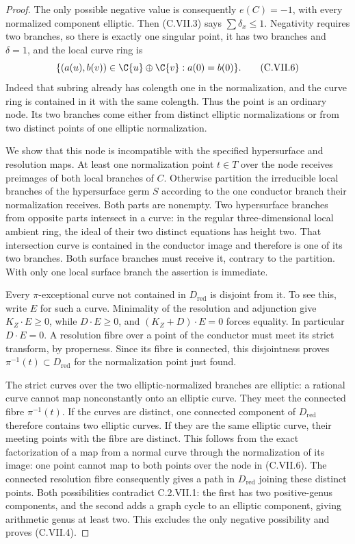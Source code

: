 \begin{proof}
The only possible negative value is consequently
$e(C)=-1$, with every normalized component elliptic.
Then (C.VII.3) says $\sum\delta_x\le1$.
Negativity requires two branches, so there is exactly
one singular point, it has two branches and
$\delta=1$, and the local curve ring is
\[
 \{(a(u),b(v))\in\C\{u\}\oplus\C\{v\}:a(0)=b(0)\}.
\tag{C.VII.6}
\]
Indeed that subring already has colength one in the
normalization, and the curve ring is contained in it
with the same colength. Thus the point is an ordinary
node. Its two branches come either from distinct
elliptic normalizations or from two distinct points
of one elliptic normalization.

We show that this node is incompatible with the
specified hypersurface and resolution maps. At least
one normalization point $t\in T$ over the node receives
preimages of both local branches of $C$.
Otherwise partition the irreducible local branches
of the hypersurface germ $S$ according to the one
conductor branch their normalization receives. Both
parts are nonempty. Two hypersurface branches from
opposite parts intersect in a curve: in the regular
three-dimensional local ambient ring, the ideal of
their two distinct equations has height two.
That intersection curve is contained in the conductor
image and therefore is one of its two branches.
Both surface branches must receive it, contrary to
the partition. With only one local surface branch
the assertion is immediate.

Every $\pi$-exceptional curve not contained in
$D_{\mathrm{red}}$ is disjoint from it. To see this,
write $E$ for such a curve. Minimality of the
resolution and adjunction give $K_Z\cdot E\ge0$,
while $D\cdot E\ge0$, and
$(K_Z+D)\cdot E=0$ forces equality. In particular
$D\cdot E=0$. A resolution fibre over a point of
the conductor must meet its strict transform, by
properness. Since its fibre is connected, this
disjointness proves
$\pi^{-1}(t)\subset D_{\mathrm{red}}$ for the
normalization point just found.

The strict curves over the two elliptic-normalized
branches are elliptic: a rational curve cannot map
nonconstantly onto an elliptic curve. They meet the
connected fibre $\pi^{-1}(t)$. If the curves are
distinct, one connected component of $D_{\mathrm{red}}$
therefore contains two elliptic curves. If they are
the same elliptic curve, their meeting points with
the fibre are distinct. This follows from the exact
factorization of a map from a normal curve through
the normalization of its image: one point cannot
map to both points over the node in (C.VII.6).
The connected resolution fibre consequently gives
a path in $D_{\mathrm{red}}$ joining these distinct
points. Both possibilities contradict C.2.VII.1:
the first has two positive-genus components, and
the second adds a graph cycle to an elliptic
component, giving arithmetic genus at least two.
This excludes the only negative possibility and
proves (C.VII.4).
\end{proof}

